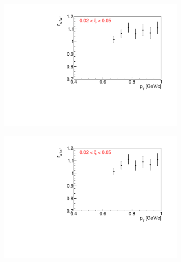 \captionsetup{format=default,indention=0pt,justification=justified}


\begin{figure}[h!]
	\centering
	\begin{subfigure}{.32\textwidth}
		\includegraphics[width=\linewidth, page=3]{chapters/chrgSTAR/img/dEdx/fit2019_fitResult_2_0_step_1.pdf}
	\end{subfigure}
	\begin{subfigure}{.32\textwidth}
		\includegraphics[width=\linewidth, page=4]{chapters/chrgSTAR/img/dEdx/fit2019_fitResult_2_0_step_1.pdf}
	\end{subfigure}
	\begin{subfigure}{.32\textwidth}

\end{subfigure}
\end{figure}
